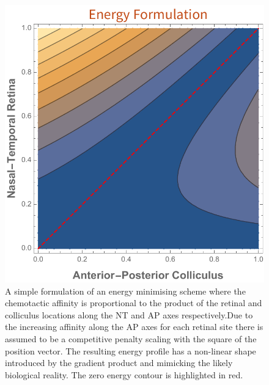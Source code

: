 \begin{figure}[h!]
	\centering
	\includegraphics[width=\textwidth]{images/introduction/energy_chemotaxis_type1}
	\def\c{A simple formulation of an energy minimising scheme where the chemotactic affinity is proportional to the product of the retinal and colliculus locations along the NT and AP axes respectively.}
	\caption[\c]{\c Due to the increasing affinity along the AP axes for each retinal site there is assumed to be a competitive penalty scaling with the square of the position vector. The resulting energy profile has a non-linear shape introduced by the gradient product and mimicking the likely biological reality. The zero energy contour is highlighted in red. \label{fig:affchemotaxistype1}} 
\end{figure}

